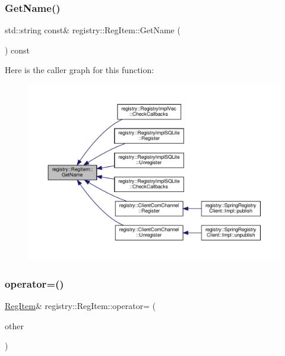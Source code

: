 \subsubsection{\texorpdfstring{Get\+Name()}{GetName()}}
{\footnotesize\ttfamily std\+::string const\& registry\+::\+Reg\+Item\+::\+Get\+Name (\begin{DoxyParamCaption}{ }\end{DoxyParamCaption}) const\hspace{0.3cm}{\ttfamily [inline]}}

Here is the caller graph for this function\+:
\nopagebreak
\begin{figure}[H]
\begin{center}
\leavevmode
\includegraphics[width=350pt]{classregistry_1_1RegItem_a36de17d47505b30932fb0666e151a3a5_icgraph}
\end{center}
\end{figure}
\mbox{\label{classregistry_1_1RegItem_a25fc5c871aa9616acf4092d6cd905a3d}} 
\subsubsection{\texorpdfstring{operator=()}{operator=()}\hspace{0.1cm}{\footnotesize\ttfamily [1/2]}}
{\footnotesize\ttfamily \hyperlink{classregistry_1_1RegItem}{Reg\+Item}\& registry\+::\+Reg\+Item\+::operator= (\begin{DoxyParamCaption}\item[{\hyperlink{classregistry_1_1RegItem}{Reg\+Item} const \&}]{other }\end{DoxyParamCaption})\hspace{0.3cm}{\ttfamily [inline]}}

